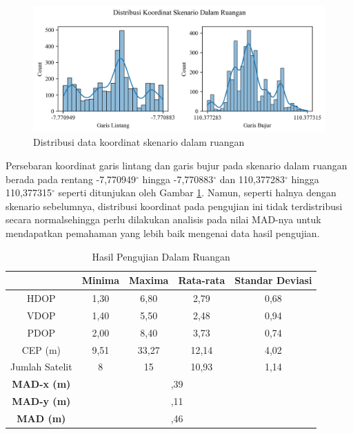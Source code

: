 \begin{figure}[H]
	\centering
	\begin{adjustbox}{width=\textwidth}
		\includegraphics{contents/chapter-4/2-skenario-indoor/distribution.png}
	\end{adjustbox}
	\caption{Distribusi data koordinat skenario dalam ruangan}
	\label{Fig:indoor-distribution}
\end{figure}

Persebaran koordinat garis lintang dan garis bujur pada skenario dalam ruangan berada pada rentang -7,770949$^{\circ}$ hingga -7,770883$^{\circ}$ dan 110,377283$^{\circ}$ hingga 110,377315$^{\circ}$ seperti ditunjukan oleh Gambar \ref{Fig:indoor-distribution}. Namun, seperti halnya dengan skenario sebelumnya, distribusi koordinat pada pengujian ini tidak terdistribusi secara normalsehingga perlu dilakukan analisis pada nilai MAD-nya untuk mendapatkan pemahaman yang lebih baik mengenai data hasil pengujian.

\begin{table}[H]
	\caption{Hasil Pengujian Dalam Ruangan}
	\vspace{0.5em}
	\centering
	\begin{tabular}{ccccc}
		\hline
		& \textbf{Minima} & \textbf{Maxima} & \textbf{Rata-rata} & \textbf{Standar Deviasi}\\
		\hline 
		HDOP & 1,30 & 6,80 & 2,79 & 0,68\\
		VDOP & 1,40 & 5,50 & 2,48 & 0,94\\
		PDOP & 2,00 & 8,40 & 3,73 & 0,74\\
		CEP (m) & 9,51	& 33,27 & 12,14 & 4,02\\
		Jumlah Satelit & 8 & 15 & 10,93 & 1,14\\
		\hline
		\textbf{MAD-x (m)} & & \multicolumn{2}{c}{\centering 7,39} & \\
		\hline
		\textbf{MAD-y (m)} & & \multicolumn{2}{c}{\centering 4,11} & \\
		\hline
		\textbf{MAD (m)} & & \multicolumn{2}{c}{\centering 8,46} & \\
		\hline
	\end{tabular}
	\label{Tab: indoor-table}
\end{table}

